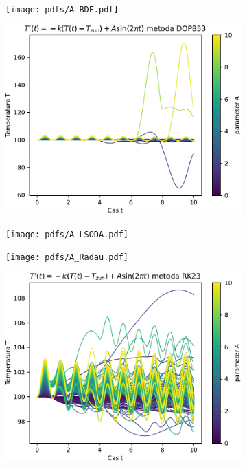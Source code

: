 \begin{figure}[h]
    \centering
    \begin{subfigure}[b]{0.45\textwidth}
        \texttt{[image: pdfs/A\_BDF.pdf]}
    \end{subfigure}
    \hfill
    \begin{subfigure}[b]{0.45\textwidth}
        \includegraphics[width=\textwidth]{pdfs/A_DOP853.pdf}
    \end{subfigure}
    \par
    \begin{subfigure}[b]{0.45\textwidth}
        \texttt{[image: pdfs/A\_LSODA.pdf]}
    \end{subfigure}
    \hfill
    \begin{subfigure}[b]{0.45\textwidth}
        \texttt{[image: pdfs/A\_Radau.pdf]}
    \end{subfigure}
    \par
    \begin{subfigure}[b]{0.45\textwidth}
        \includegraphics[width=\textwidth]{pdfs/A_RK23.pdf}

\end{subfigure}
\end{figure}

